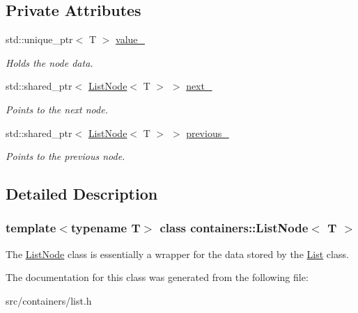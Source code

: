 \subsection*{Private Attributes}
\begin{DoxyCompactItemize}
\item 
\mbox{\label{classcontainers_1_1_list_node_af4203020495e2a5feaee17ca16bc9846}} 
std\+::unique\+\_\+ptr$<$ T $>$ \hyperlink{classcontainers_1_1_list_node_af4203020495e2a5feaee17ca16bc9846}{value\+\_\+}
\begin{DoxyCompactList}\small\item\em Holds the node data. \end{DoxyCompactList}\item 
\mbox{\label{classcontainers_1_1_list_node_a1498d1898e79b1a5e8cc9ee3a557c041}} 
std\+::shared\+\_\+ptr$<$ \hyperlink{classcontainers_1_1_list_node}{List\+Node}$<$ T $>$ $>$ \hyperlink{classcontainers_1_1_list_node_a1498d1898e79b1a5e8cc9ee3a557c041}{next\+\_\+}
\begin{DoxyCompactList}\small\item\em Points to the next node. \end{DoxyCompactList}\item 
\mbox{\label{classcontainers_1_1_list_node_a063efd82aacb8e34a7caaad160dc2bb8}} 
std\+::shared\+\_\+ptr$<$ \hyperlink{classcontainers_1_1_list_node}{List\+Node}$<$ T $>$ $>$ \hyperlink{classcontainers_1_1_list_node_a063efd82aacb8e34a7caaad160dc2bb8}{previous\+\_\+}
\begin{DoxyCompactList}\small\item\em Points to the previous node. \end{DoxyCompactList}\end{DoxyCompactItemize}


\subsection{Detailed Description}
\subsubsection*{template$<$typename T$>$\newline
class containers\+::\+List\+Node$<$ T $>$}

The {\ttfamily \hyperlink{classcontainers_1_1_list_node}{List\+Node}} class is essentially a wrapper for the data stored by the {\ttfamily \hyperlink{classcontainers_1_1_list}{List}} class. 

The documentation for this class was generated from the following file\+:\begin{DoxyCompactItemize}
\item 
src/containers/list.\+h\end{DoxyCompactItemize}
